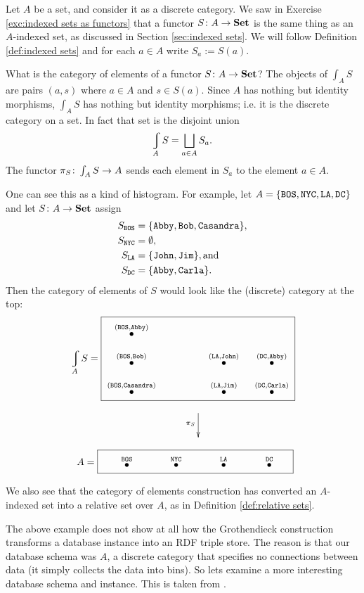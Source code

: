 \begin{example}

Let $A$ be a set, and consider it as a discrete category. We saw in Exercise \ref{exc:indexed sets as functors} that a functor $S\colon A\rightarrow{\bf Set}$ is the same thing as an $A$-indexed set, as discussed in Section \ref{sec:indexed sets}. We will follow Definition \ref{def:indexed sets} and for each $a\in A$ write $S_a:=S(a)$.

What is the category of elements of a functor $S\colon A\rightarrow{\bf Set}$? The objects of $\int_AS$ are pairs $(a,s)$ where $a\in A$ and $s\in S(a)$. Since $A$ has nothing but identity morphisms, $\int_AS$ has nothing but identity morphisms; i.e. it is the discrete category on a set. In fact that set is the disjoint union $$\varint_AS=\bigsqcup_{a\in A}S_a.$$ The functor $\pi_S\colon\int_AS\rightarrow A$ sends each element in $S_a$ to the element $a\in A$. 

One can see this as a kind of histogram. For example, let $A=\{{\tt BOS, NYC, LA, DC}\}$ and let $S\colon A\rightarrow{\bf Set}$ assign 
\begin{align*}
S_{{\tt BOS}}&=\{{\tt Abby, Bob, Casandra}\},\\
S_{\tt NYC}&=\emptyset,\\
S_{\tt LA}&=\{{\tt John, Jim}\}, \textnormal{and}\\
S_{\tt DC}&=\{{\tt Abby,Carla}\}.
\end{align*}
Then the category of elements of $S$ would look like the (discrete) category at the top: 
\begin{align}\label{dia:elements for cities}
\varint_AS=\parbox{2.7in}{\fbox{\xymatrix@=10pt{
\LTO{(BOS,Abby)}\\
\LTO{(BOS,Bob)}&\hspace{.3in}&\LTO{(LA,John)}&\LTO{(DC,Abby)}\\
\LTO{(BOS,Casandra)}&&\LTO{(LA,Jim)}&\LTO{(DC,Carla)}
}}}
\end{align}
$$
\hsp\xymatrix{~\ar[d]_{\pi_S}\\~}
$$
$$
\;\;A=\fbox{\xymatrix@=33pt{\hspace{.25in}\LTO{BOS}&\LTO{NYC}&\LTO{LA}&\LTO{DC}\hspace{.2in}}}
$$

We also see that the category of elements construction has converted an $A$-indexed set into a relative set over $A$, as in Definition \ref{def:relative sets}.

\end{example}

The above example does not show at all how the Grothendieck construction transforms a database instance into an RDF triple store. The reason is that our database schema was $A$, a discrete category that specifies no connections between data (it simply collects the data into bins). 
So lets examine a more interesting database schema and instance. This is taken from \cite{Sp2}.

